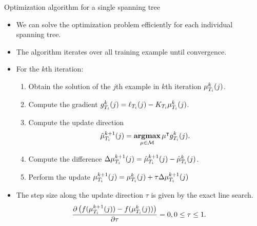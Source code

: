\documentclass[first=dgreen,second=purple,logo=yellowexc]{aaltoslides}
\begin{document}
\begin{frame}{Optimization algorithm for a single spanning tree}
	\begin{itemize}\footnotesize
		\item We can solve the optimization problem efficiently for each individual spanning tree. 
		\item The algorithm iterates over all training example until convergence.
		\item For the $k$th iteration:
		\begin{enumerate}\footnotesize
			\item Obtain the solution of the $j$th example in $k$th iteration $\mathbf {\mu}_{T_i}^k(j)$.
			\item Compute the gradient $g_{T_i}^k(j) = \ell_{T_i}(j) - K_{T_i}\mathbf {\mu}_{T_i}^k(j)$.
			\item Compute the update direction 
			\begin{align*}
				\hat{\mathbf {\mu}}_{T_i}^{k+1}(j) = \underset{\mathbf {\mu}\in\mathcal{M}}{\textbf{argmax}}\,\mathbf {\mu}^{\intercal} g_{T_i}^k(j).
			\end{align*}
			\item Compute the difference $\Delta\mathbf {\mu}_{T_i}^{k+1}(j) = \hat{\mathbf {\mu}}_{T_i}^{k+1}(j) - \hat{\mathbf {\mu}}_{T_i}^{k}(j)$.
			\item Perform the update $\mathbf {\mu}_{T_i}^{k+1}(j) = \mathbf {\mu}_{T_i}^k(j) + \tau\Delta\mathbf {\mu}_{T_i}^{k+1}(j)$
		\end{enumerate}
		\item The step size along the update direction $\tau$ is given by the exact line search.
		\begin{align*}
			\frac{\partial \left(f(\mathbf {\mu}_{T_i}^{k+1}(j))-f(\mathbf {\mu}_{T_i}^k(j))\right)}{\partial \tau} = 0, 0\le\tau\le1.
		\end{align*}
	\end{itemize}
\end{frame}
\end{document}
